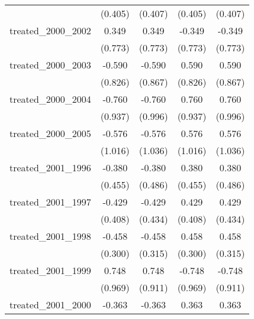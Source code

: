 {\begin{tabular}{l*{4}{c}}
            &     (0.405)         &     (0.407)         &     (0.405)         &     (0.407)         \\
[1em]
treated\_2000\_2002&       0.349         &       0.349         &      -0.349         &      -0.349         \\
            &     (0.773)         &     (0.773)         &     (0.773)         &     (0.773)         \\
[1em]
treated\_2000\_2003&      -0.590         &      -0.590         &       0.590         &       0.590         \\
            &     (0.826)         &     (0.867)         &     (0.826)         &     (0.867)         \\
[1em]
treated\_2000\_2004&      -0.760         &      -0.760         &       0.760         &       0.760         \\
            &     (0.937)         &     (0.996)         &     (0.937)         &     (0.996)         \\
[1em]
treated\_2000\_2005&      -0.576         &      -0.576         &       0.576         &       0.576         \\
            &     (1.016)         &     (1.036)         &     (1.016)         &     (1.036)         \\
[1em]
treated\_2001\_1996&      -0.380         &      -0.380         &       0.380         &       0.380         \\
            &     (0.455)         &     (0.486)         &     (0.455)         &     (0.486)         \\
[1em]
treated\_2001\_1997&      -0.429         &      -0.429         &       0.429         &       0.429         \\
            &     (0.408)         &     (0.434)         &     (0.408)         &     (0.434)         \\
[1em]
treated\_2001\_1998&      -0.458         &      -0.458         &       0.458         &       0.458         \\
            &     (0.300)         &     (0.315)         &     (0.300)         &     (0.315)         \\
[1em]
treated\_2001\_1999&       0.748         &       0.748         &      -0.748         &      -0.748         \\
            &     (0.969)         &     (0.911)         &     (0.969)         &     (0.911)         \\
[1em]
treated\_2001\_2000&      -0.363\sym{*}  &      -0.363\sym{*}  &       0.363\sym{*}  &       0.363\sym{*}  \\

\end{tabular}}
